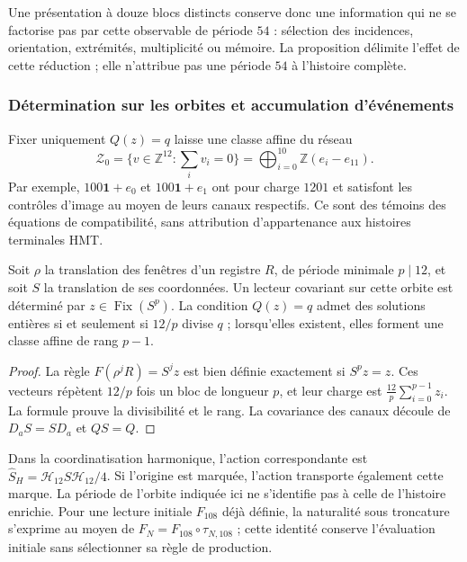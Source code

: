 Une présentation à douze blocs distincts conserve donc
une information qui ne se factorise pas par cette observable de période $54$ :
sélection des incidences, orientation, extrémités, multiplicité ou
mémoire. La proposition délimite l’effet de cette réduction ; elle
n’attribue pas une période $54$ à l’histoire complète.

\subsubsection{Détermination sur les orbites et accumulation d’événements}

Fixer uniquement $Q(z)=q$ laisse une classe affine du réseau
\[
 \mathcal Z_0=\{v\in\mathbb Z^{12}:\sum_i v_i=0\}
 =\bigoplus_{i=0}^{10}\mathbb Z(e_i-e_{11}).
\]
Par exemple, $100\mathbf1+e_0$ et $100\mathbf1+e_1$ ont pour
charge $1201$ et satisfont les contrôles d’image au moyen de leurs
canaux respectifs. Ce sont des témoins des équations de compatibilité,
sans attribution d’appartenance aux histoires terminales HMT.

\begin{proposition}
\label{iii:r25:covariancia}
Soit $\rho$ la translation des fenêtres d’un registre $R$, de
période minimale $p\mid12$, et soit $S$ la translation de ses
coordonnées. Un lecteur covariant sur cette orbite est déterminé
par $z\in\operatorname{Fix}(S^p)$. La condition $Q(z)=q$
admet des solutions entières si et seulement si $12/p$ divise $q$ ;
lorsqu’elles existent, elles forment une classe affine de rang $p-1$.
\end{proposition}
\begin{proof}
La règle $F(\rho^jR)=S^jz$ est bien définie exactement si
$S^pz=z$. Ces vecteurs répètent $12/p$ fois un bloc de
longueur $p$, et leur charge est $\frac{12}{p}\sum_{i=0}^{p-1}z_i$.
La formule prouve la divisibilité et le rang. La covariance des
canaux découle de $D_aS=SD_a$ et $QS=Q$.
\end{proof}

Dans la coordinatisation harmonique, l’action correspondante est
$\widehat S_H=\mathcal H_{12}S\mathcal H_{12}/4$.
Si l’origine est marquée, l’action transporte également cette marque.
La période de l’orbite indiquée ici ne s’identifie pas à celle de
l’histoire enrichie. Pour une lecture initiale $F_{108}$ déjà
définie, la naturalité sous troncature s’exprime au moyen de
$F_N=F_{108}\circ\tau_{N,108}$ ; cette identité conserve
l’évaluation initiale sans sélectionner sa règle de production.

